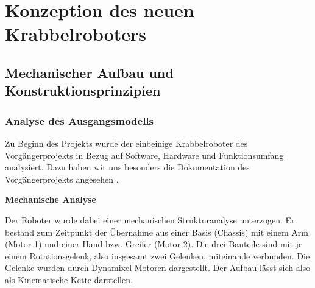 \section{Konzeption des neuen Krabbelroboters}
\label{sec:konzeption}


\subsection{Mechanischer Aufbau und Konstruktionsprinzipien}

\subsubsection{Analyse des Ausgangsmodells}

Zu Beginn des Projekts wurde der einbeinige Krabbelroboter des Vorgängerprojekts in Bezug auf Software, Hardware und Funktionsumfang analysiert. Dazu haben wir uns besonders die Dokumentation des Vorgängerprojekts angesehen \cite{vorgängerprojekt}. 

\textbf{Mechanische Analyse}

Der Roboter wurde dabei einer mechanischen Strukturanalyse unterzogen. Er bestand zum Zeitpunkt der Übernahme aus einer Basis (Chassis) mit einem Arm (Motor 1) und einer Hand bzw. Greifer (Motor 2). Die drei Bauteile sind mit je einem Rotationsgelenk, also insgesamt zwei Gelenken, miteinande verbunden. Die Gelenke wurden durch Dynamixel Motoren dargestellt. Der Aufbau lässt sich also als Kinematische Kette darstellen.


